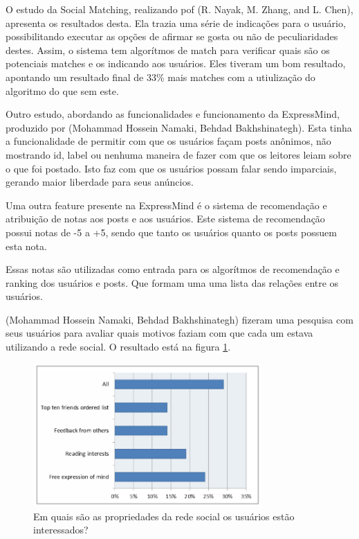 O estudo da Social Matching, realizando pof (R. Nayak, M. Zhang, and L. Chen),
apresenta os resultados desta. Ela trazia uma série de indicações para o usuário,
possibilitando executar as opções de afirmar se gosta ou não de peculiaridades
destes. Assim, o sistema tem algorítmos de match para verificar quais são
os potenciais matches e os indicando aos usuários. Eles tiveram um bom resultado,
apontando um resultado final de 33\% mais matches com a utiulização do algoritmo
do que sem este.

Outro estudo, abordando as funcionalidades e funcionamento da ExpressMind,
produzido por (Mohammad Hossein Namaki, Behdad Bakhshinategh). Esta tinha a funcionalidade
de  permitir com que os usuários façam posts anônimos, não mostrando id, label ou nenhuma
maneira de fazer com que os leitores leiam sobre o que foi postado. Isto faz com que os
usuários possam falar sendo imparciais, gerando maior liberdade para
seus anúncios.

Uma outra feature presente na ExpressMind é o sistema de recomendação e atribuição
de notas aos posts e aos usuários. Este sistema de recomendação possui notas
de -5 a +5, sendo que tanto os usuários quanto os posts possuem esta nota.

Essas notas são utilizadas como entrada para os algorítmos de recomendação e
ranking dos usuários e posts. Que formam uma uma lista das relações entre
os usuários.

(Mohammad Hossein Namaki, Behdad Bakhshinategh) fizeram uma pesquisa com seus usuários
para avaliar quais motivos faziam com que cada um estava utilizando a rede social. 
O resultado está na figura \ref{fig:expressmind}.


\begin{figure}[h]
    \centering
    \includegraphics[width=330px, scale=1]{figuras/expressmind}
    \caption{Em quais são as propriedades da rede social os usuários estão interessados?}
    \label{fig:expressmind}
\end{figure}

